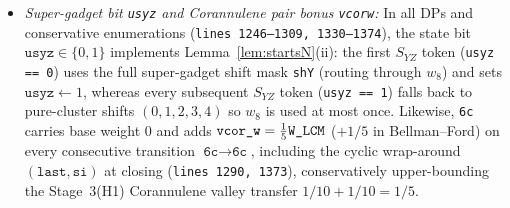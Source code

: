 \documentclass[11pt,reqno]{amsart}
\theoremstyle{plain}
\theoremstyle{definition}
\theoremstyle{remark}
\DeclareRobustCommand{\_}{\ifmmode\text{\textunderscore}\else\textunderscore\allowbreak\fi}
\begin{document}
\begin{enumerate}[label=(\alph*),leftmargin=2.2em]
\begin{itemize}[leftmargin=1.5em]
    \item \emph{Super-gadget bit \texttt{usyz} and Corannulene pair bonus \texttt{vcor\_w}:} In all DPs and conservative enumerations (\texttt{lines 1246--1309, 1330--1374}), the state bit $\texttt{usyz} \in \{0, 1\}$ implements Lemma~\ref{lem:startsN}(ii): the first $S_{YZ}$ token (\texttt{usyz == 0}) uses the full super-gadget shift mask \texttt{sh\_Y} (routing through $w_8$) and sets $\texttt{usyz} \gets 1$, whereas every subsequent $S_{YZ}$ token (\texttt{usyz == 1}) falls back to pure-cluster shifts $(0, 1, 2, 3, 4)$ so $w_8$ is used at most once. Likewise, \texttt{6c} carries base weight $0$ and adds $\texttt{vcor\_w} = \frac{1}{5}\texttt{W\_LCM}$ ($+1/5$ in Bellman--Ford) on every consecutive transition $\texttt{6c} \to \texttt{6c}$, including the cyclic wrap-around $(\texttt{last}, \texttt{si})$ at closing (\texttt{lines 1290, 1373}), conservatively upper-bounding the Stage~3(H1) Corannulene valley transfer $1/10 + 1/10 = 1/5$.
  \end{itemize}
\end{enumerate}
\end{document}
